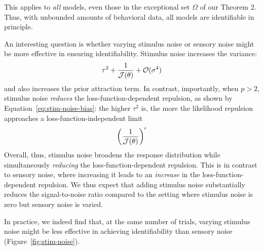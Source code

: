 \documentclass[si.tex]{subfiles}
\begin{document}
This applies to \emph{all} models, even those in the exceptional set $\Omega$ of our Theorem 2.
Thus, with unbounded amounts of behavioral data, all models are identifiable in principle.

An interesting question is whether varying stimulus noise or sensory noise might be more effective in ensuring identifiability.
Stimulus noise increases the variance:
\begin{equation}
\tau^2 + \frac{1}{\mathcal{J}(\theta)} + \mathcal{O}(\sigma^4)
\end{equation}
and also increases the prior attraction term.
In contrast, importantly, when $p>2$, stimulus noise \emph{reduces} the loss-function-dependent repulsion, as shown by Equation~\ref{eq:stim-noise-bias}: the higher $\tau^2$ is, the more the likelihood repulsion approaches a loss-function-independent limit
\begin{equation}
\left(\frac{1}{\mathcal{J}(\theta)}\right)'
\end{equation}
Overall, thus, stimulus noise broadens the response distribution while simultaneously \emph{reducing} the loss-function-dependent repulsion.
This is in contrast to sensory noise, where increasing it leads to an \emph{increase} in the loss-function-dependent repulsion.
We thus expect that adding stimulus noise substantially reduces the signal-to-noise ratio compared to the setting where stimulus noise is zero but sensory noise is varied.

In practice, we indeed find that, at the same number of trials, varying stimulus noise might be less effective in achieving identifiability than sensory noise (Figure~\ref{fig:stim-noise}).




\begin{comment}
python3 evaluateCrossValidationResults_Synthetic_Gardelle_NonF_StimNoise.py SimulateSynthetic_Parameterized_OtherNoiseLevels_Grid_VarySize_WithStimNoise.py_180_2_5_2345_N40000_STEEPPERIODIC_STEEPPERIODIC.txt
python3 evaluateCrossValidationResults_Synthetic_Gardelle_NonF_StimNoise.py SimulateSynthetic_Parameterized_OtherNoiseLevels_Grid_VarySize_WithStimNoise.py_180_8_5_2345_N40000_STEEPPERIODIC_STEEPPERIODIC.txt

python3 RunSynthetic_FreePrior_CosineLoss_OnSim_WithStimNoise_VIZ.py 2 0 10.0 180 SimulateSynthetic_Parameterized_OtherNoiseLevels_Grid_VarySize_WithStimNoise.py_180_2_5_2345_N40000_STEEPPERIODIC_STEEPPERIODIC.txt
python3 RunSynthetic_FreePrior_CosineLoss_OnSim_WithStimNoise_VIZ.py 8 0 10.0 180 SimulateSynthetic_Parameterized_OtherNoiseLevels_Grid_VarySize_WithStimNoise.py_180_8_5_2345_N40000_STEEPPERIODIC_STEEPPERIODIC.txt

python3 CounterfactualModel_VIZ_WithStimNoise.py 2 0 10.0 180 STEEPPERIODIC STEEPPERIODIC 5 2345
python3 CounterfactualModel_VIZ_WithStimNoise.py 8 0 10.0 180 STEEPPERIODIC STEEPPERIODIC 5 2345


\end{comment}
\end{document}
